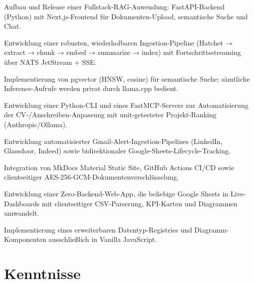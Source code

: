 \documentclass[10pt,a4paper]{resume}
\begin{document}
\bullets
  \item Aufbau und Release einer Fullstack-RAG-Anwendung: FastAPI-Backend (Python) mit Next.js-Frontend für Dokumenten-Upload, semantische Suche und Chat.
  \item Entwicklung einer robusten, wiederholbaren Ingestion-Pipeline (Hatchet → extract → chunk → embed → summarize → index) mit Fortschrittsstreaming über NATS JetStream + SSE.
  \item Implementierung von pgvector (HNSW, cosine) für semantische Suche; sämtliche Inference-Aufrufe werden privat durch llama.cpp bedient.
\bulletsend
\vspace{1.0pt}
\bullets
  \item Entwicklung einer Python-CLI und eines FastMCP-Servers zur Automatisierung der CV-/Anschreiben-Anpassung mit unit-getesteter Projekt-Ranking (Anthropic/Ollama).
  \item Entwicklung automatisierter Gmail-Alert-Ingestion-Pipelines (LinkedIn, Glassdoor, Indeed) sowie bidirektionaler Google-Sheets-Lifecycle-Tracking.
  \item Integration von MkDocs Material Static Site, GitHub Actions CI/CD sowie clientseitiger AES-256-GCM-Dokumentenverschlüsselung.
\bulletsend
\vspace{1.0pt}
\bullets
  \item Entwicklung einer Zero-Backend-Web-App, die beliebige Google Sheets in Live-Dashboards mit clientseitiger CSV-Parserung, KPI-Karten und Diagrammen umwandelt.
  \item Implementierung eines erweiterbaren Datentyp-Registries und Diagramm-Komponenten ausschließlich in Vanilla JavaScript.
\bulletsend

\section{Kenntnisse}
\end{document}
